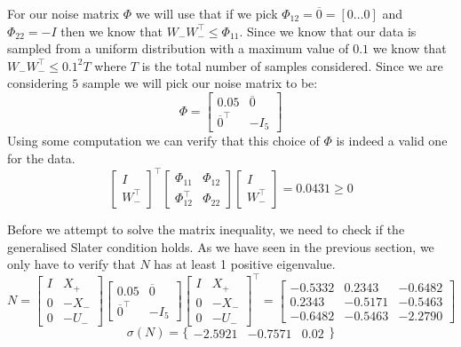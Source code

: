 For our noise matrix $\Phi$ we will use that if we pick $\Phi_{12} = \overline{0} = [0 \dots 0]$ and $\Phi_{22} = -I$ then we know that $W_- W_-^\top \leq \Phi_{11}$. Since we know that our data is sampled from a uniform distribution with a maximum value of $0.1$ we know that $W_- W_-^\top \leq 0.1^2 T$ where $T$ is the total number of samples considered. Since we are considering $5$ sample we will pick our noise matrix to be:
\begin{equation*}
	\Phi = \begin{bmatrix} 0.05 & \overline{0} \\ \overline{0}^\top & -I_5 \end{bmatrix}
\end{equation*}
Using some computation we can verify that this choice of $\Phi$ is indeed a valid one for the data.
\begin{equation}
\begin{bmatrix} I \\ W_-^\top \end{bmatrix} ^\top
\begin{bmatrix} \Phi_{11} & \Phi_{12} \\ \Phi_{12}^\top & \Phi_{22} \end{bmatrix}
\begin{bmatrix} I \\ W_-^\top \end{bmatrix} = 0.0431 \geq 0
\end{equation}

Before we attempt to solve the matrix inequality, we need to check if the generalised Slater condition holds. As we have seen in the previous section, we only have to verify that $N$ has at least 1 positive eigenvalue.
\begin{equation*}
 N = 
 \begin{bmatrix} I&X_+ \\ 0 & -X_- \\ 0&-U_- \end{bmatrix}
 \begin{bmatrix} 0.05 & \overline{0} \\ \overline{0}^\top & -I_5 \end{bmatrix}
 \begin{bmatrix} I&X_+ \\ 0 & -X_- \\ 0&-U_- \end{bmatrix}^\top 
 =
 \begin{bmatrix} 
 -0.5332 &  0.2343 & -0.6482\\
  0.2343 & -0.5171 & -0.5463 \\
 -0.6482 & -0.5463 & -2.2790
 \end{bmatrix} 
\end{equation*}
\begin{equation*}
 \sigma(N) = \{ \begin{array}{ccc}
 -2.5921 & -0.7571 & 0.02
 \end{array} \}
\end{equation*}

